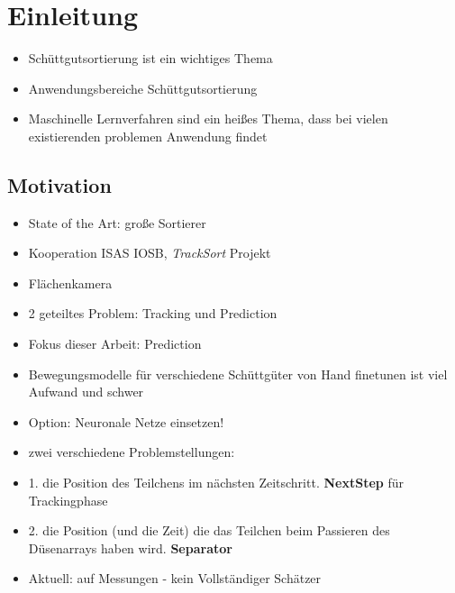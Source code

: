 \chapter{Einleitung}

\begin{itemize}
    \item Schüttgutsortierung ist ein wichtiges Thema 
    \item Anwendungsbereiche Schüttgutsortierung
    \item Maschinelle Lernverfahren sind ein heißes Thema, dass bei vielen existierenden problemen Anwendung findet
\end{itemize}


\section{Motivation}

\color{blue}
\begin{itemize}
    \item State of the Art: große Sortierer 
    \item Kooperation ISAS IOSB, \textit{TrackSort} Projekt 
    \item Flächenkamera
    \item 2 geteiltes Problem: Tracking und Prediction
    \item Fokus dieser Arbeit: Prediction
    \item Bewegungsmodelle für verschiedene Schüttgüter von Hand finetunen ist viel Aufwand und schwer
    \item Option: Neuronale Netze einsetzen! 
    \item zwei verschiedene Problemstellungen:
    \item 1. die Position des Teilchens im nächsten Zeitschritt. \textbf{NextStep} für Trackingphase
    \item 2. die Position (und die Zeit) die das Teilchen beim Passieren des Düsenarrays haben wird. \textbf{Separator}
    \item Aktuell: auf Messungen - kein Vollständiger Schätzer
\end{itemize}
\color{black}



